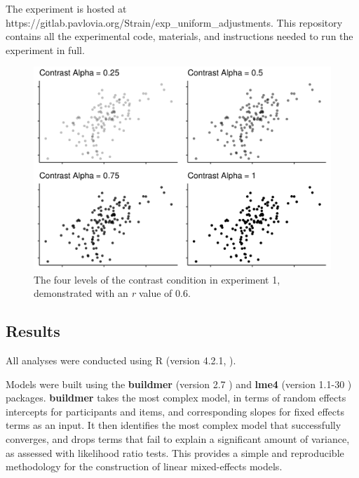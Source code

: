 \documentclass[preprint, 3p,
authoryear]{elsarticle} %
\begin{document}
The experiment is hosted at
https://gitlab.pavlovia.org/Strain/exp\_uniform\_adjustments. This
repository contains all the experimental code, materials, and
instructions needed to run the experiment in full.

\begin{figure}

\includegraphics[width=1\linewidth]{plot_examples/uniform_adjustments_plot_examples} \hfill{}

\caption{\label{e1-example-plots}The four levels of the contrast condition in experiment 1, demonstrated with an \textit{r} value of 0.6.}\label{fig:e1-example-plots}
\end{figure}

\hypertarget{results}{%
\subsection{Results}\label{results}}

All analyses were conducted using R (version 4.2.1, \citep{r_core}).

Models were built using the \textbf{buildmer} (version 2.7
\citep{voeten_buildmer_2022}) and \textbf{lme4} (version 1.1-30
\citep{bates_lme4_2015}) packages. \textbf{buildmer} takes the most
complex model, in terms of random effects intercepts for participants
and items, and corresponding slopes for fixed effects terms
\citep{barr_random_2013} as an input. It then identifies the most
complex model that successfully converges, and drops terms that fail to
explain a significant amount of variance, as assessed with likelihood
ratio tests. This provides a simple and reproducible methodology for the
construction of linear mixed-effects models.
\end{document}
